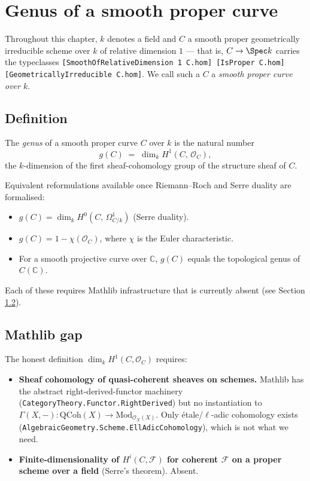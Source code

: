 \chapter{Genus of a smooth proper curve}
\label{chap:Genus}

Throughout this chapter, $k$ denotes a field and $C$ a smooth proper geometrically irreducible scheme over $k$ of relative dimension $1$ — that is, $C \to \Spec k$ carries the typeclasses
\lstinline{[SmoothOfRelativeDimension 1 C.hom] [IsProper C.hom] [GeometricallyIrreducible C.hom]}.
We call such a $C$ a \emph{smooth proper curve over $k$}.

\section{Definition}

\begin{definition}
  \label{def:genus}
  \leanok
  The \emph{genus} of a smooth proper curve $C$ over $k$ is the natural number
  \[
    g(C) \;=\; \dim_k H^1(C,\, \mathcal O_C),
  \]
  the $k$-dimension of the first sheaf-cohomology group of the structure sheaf of $C$.
\end{definition}

Equivalent reformulations available once Riemann–Roch and Serre duality are formalised:
\begin{itemize}
  \item $g(C) = \dim_k H^0(C,\, \Omega^1_{C/k})$ (Serre duality).
  \item $g(C) = 1 - \chi(\mathcal O_C)$, where $\chi$ is the Euler characteristic.
  \item For a smooth projective curve over $\mathbb C$, $g(C)$ equals the topological genus of $C(\mathbb C)$.
\end{itemize}
Each of these requires Mathlib infrastructure that is currently absent (see Section \ref{sec:Genus_status}).

\section{Mathlib gap}
\label{sec:Genus_status}

The honest definition $\dim_k H^1(C, \mathcal O_C)$ requires:

\begin{itemize}
  \item \textbf{Sheaf cohomology of quasi-coherent sheaves on schemes.} Mathlib has the abstract right-derived-functor machinery (\lstinline{CategoryTheory.Functor.RightDerived}) but no instantiation to $\Gamma(X, -) \colon \mathrm{QCoh}(X) \to \mathrm{Mod}_{\mathcal O_X(X)}$. Only étale/$\ell$-adic cohomology exists (\lstinline{AlgebraicGeometry.Scheme.EllAdicCohomology}), which is not what we need.
  \item \textbf{Finite-dimensionality of $H^i(C, \mathcal F)$ for coherent $\mathcal F$ on a proper scheme over a field} (Serre's theorem). Absent.
\end{itemize}

